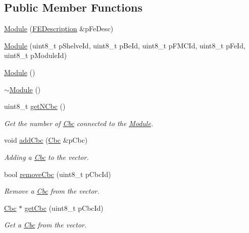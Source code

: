 \subsection*{Public Member Functions}
\begin{DoxyCompactItemize}
\item 
\hyperlink{class_ph2___hw_description_1_1_module_a7429c4855bd0a17350b9dd47b760a676}{Module} (\hyperlink{class_ph2___hw_description_1_1_f_e_description}{F\-E\-Description} \&p\-Fe\-Desc)
\item 
\hyperlink{class_ph2___hw_description_1_1_module_acb5e5f17c946438f985c209563060f26}{Module} (uint8\-\_\-t p\-Shelve\-Id, uint8\-\_\-t p\-Be\-Id, uint8\-\_\-t p\-F\-M\-C\-Id, uint8\-\_\-t p\-Fe\-Id, uint8\-\_\-t p\-Module\-Id)
\item 
\hyperlink{class_ph2___hw_description_1_1_module_aaec7dd439bdf7a1db3f2136569a00125}{Module} ()
\item 
\hyperlink{class_ph2___hw_description_1_1_module_a8142f34ea2308ed78e8d0dbb042bc5f3}{$\sim$\-Module} ()
\item 
uint8\-\_\-t \hyperlink{class_ph2___hw_description_1_1_module_a8703442b1055c0c38b4157fc155ac084}{get\-N\-Cbc} ()
\begin{DoxyCompactList}\small\item\em Get the number of \hyperlink{class_ph2___hw_description_1_1_cbc}{Cbc} connected to the \hyperlink{class_ph2___hw_description_1_1_module}{Module}. \end{DoxyCompactList}\item 
void \hyperlink{class_ph2___hw_description_1_1_module_ac2743d5056bc3053bf472e5fd94bbf14}{add\-Cbc} (\hyperlink{class_ph2___hw_description_1_1_cbc}{Cbc} \&p\-Cbc)
\begin{DoxyCompactList}\small\item\em Adding a \hyperlink{class_ph2___hw_description_1_1_cbc}{Cbc} to the vector. \end{DoxyCompactList}\item 
bool \hyperlink{class_ph2___hw_description_1_1_module_a0aa7c940311bd13a32fd4e0f251c2d27}{remove\-Cbc} (uint8\-\_\-t p\-Cbc\-Id)
\begin{DoxyCompactList}\small\item\em Remove a \hyperlink{class_ph2___hw_description_1_1_cbc}{Cbc} from the vector. \end{DoxyCompactList}\item 
\hyperlink{class_ph2___hw_description_1_1_cbc}{Cbc} $\ast$ \hyperlink{class_ph2___hw_description_1_1_module_a05ccbee9ca3eb8022e359b5e9dabe783}{get\-Cbc} (uint8\-\_\-t p\-Cbc\-Id)
\begin{DoxyCompactList}\small\item\em Get a \hyperlink{class_ph2___hw_description_1_1_cbc}{Cbc} from the vector. \end{DoxyCompactList}\end{DoxyCompactItemize}
